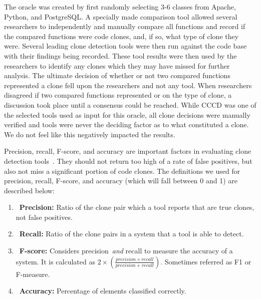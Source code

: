 \documentclass{sig-alternate}
\begin{document}
The oracle was created by first randomly selecting 3-6 classes from Apache, Python, and PostgreSQL. A specially made comparison tool allowed several researchers to independently and manually compare all functions and record if the compared functions were code clones, and, if so, what type of clone they were. Several leading clone detection tools were then run against the code base with their findings being recorded. These tool results were then used by the researchers to identify any clones which they may have missed for further analysis. The ultimate decision of whether or not two compared functions represented a clone fell upon the researchers and not any tool. When researchers disagreed if two compared functions represented or on the type of clone, a discussion took place until a consensus could be reached. While CCCD was one of the selected tools used as input for this oracle, all clone decisions were manually verified and tools were never the deciding factor as to what constituted a clone. We do not feel like this negatively impacted the results.

Precision, recall, F-score, and accuracy are important factors in evaluating clone detection tools~\cite{Zibran:2012:IRF:2231936.2231970}. They should not return too high of a rate of false positives, but also not miss a significant portion of code clones. The definitions we used for precision, recall, F-score, and accuracy (which will fall between 0 and 1) are described below:

 \begin{enumerate}
  \item~\textbf{Precision:} Ratio of the clone pair which a tool reports that are true clones, not false positives. %

 \item~\textbf{Recall:} Ratio of the clone pairs in a system that a tool is able to detect. %

  \item~\textbf{F-score:} Considers precision~\emph{and} recall to measure the accuracy of a system. It is calculated as $2\times(\frac{precision\times recall}{precision+recall})$. Sometimes referred as F1 or F-measure.

 \item~\textbf{Accuracy:} Percentage of elements classified correctly. %

\end{enumerate}
\end{document}
